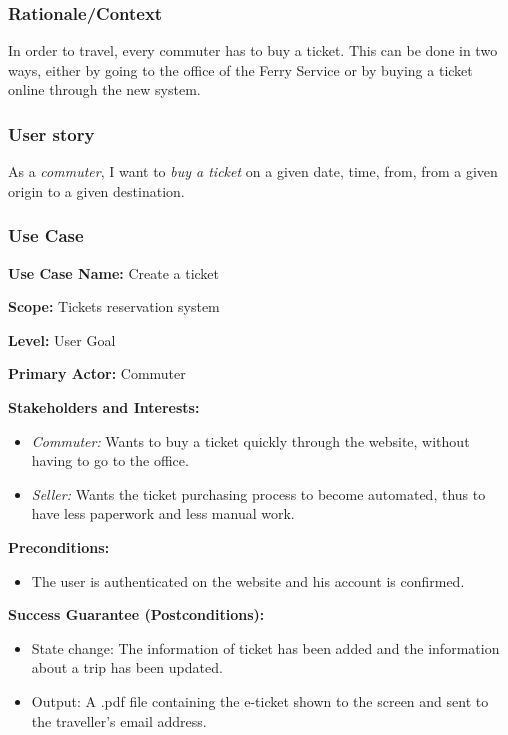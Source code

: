 \subsubsection{Rationale/Context}
In order to travel, every commuter has to buy a ticket. This can be done in two ways, either by going to the office of the Ferry Service or by buying a ticket online through the new system. 
\subsubsection{User story}
As a \textit{commuter}, I want to \textit{buy a ticket} on a given date, time, from, from a given origin to a given destination.
\subsubsection{Use Case}
\creator{\studentA}

\textbf{Use Case Name:} Create a ticket

\textbf{Scope:} Tickets reservation system

\textbf{Level:} User Goal

\textbf{Primary Actor:} Commuter

\textbf{Stakeholders and Interests:} 
\begin{itemize}
\item \textit{Commuter:} Wants to buy a ticket quickly through the website, without having to go to the office.
\item \textit{Seller:} Wants the ticket purchasing process to become automated, thus to have less paperwork and less manual work.
\end{itemize}

\textbf{Preconditions:}
\begin{itemize}
\item The user is authenticated on the website and his account is confirmed.
\end{itemize}

\textbf{Success Guarantee (Postconditions):}
\begin{itemize}
    \item State change: The information of ticket has been added and the information about a trip has been updated.
    \item Output: A .pdf file containing the e-ticket shown to the screen and sent to the traveller's email address.
\end{itemize}

